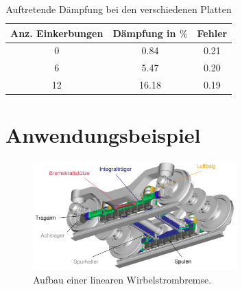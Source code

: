 \begin{frame}

  \begin{table}
    \caption{Auftretende Dämpfung bei den verschiedenen Platten}
     \begin{tabular}{c c c}
        \toprule
        Anz. Einkerbungen & Dämpfung in $\%$ & Fehler \\
        \midrule
        0 & 0.84 & 0.21 \\
        6 & 5.47 & 0.20 \\
        12 & 16.18 & 0.19 \\
        \bottomrule
      \end{tabular}
  \end{table}

\end{frame}

\section{Anwendungsbeispiel}

\begin{frame}
  \begin{figure}
    \centering
    \includegraphics[width=0.7\textwidth]{Wirbelstrombremse_Aufbau.jpg}
    \caption{Aufbau einer linearen Wirbelstrombremse. \cite{Wirbelstrombremse}}
    \label{fig:linWAufbau}
  \end{figure}
\end{frame}


\begin{frame}
  \printbibliography
\end{frame}



